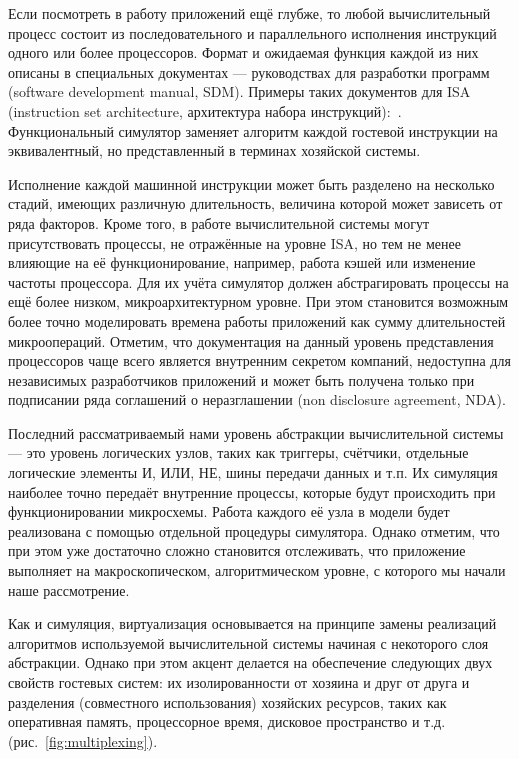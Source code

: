 Если посмотреть в работу приложений ещё глубже, то любой вычислительный процесс состоит из последовательного и параллельного исполнения инструкций одного или более процессоров. Формат и ожидаемая функция каждой из них описаны в специальных документах --- руководствах для разработки программ (\abbr software development manual, SDM). Примеры таких документов для ISA (\abbr instruction set architecture, архитектура набора инструкций):~\cite{intelmanual-7vols, amd-sdm-vol1, weaver1994sparc, arm-sdg, alpha-book}. Функциональный симулятор заменяет алгоритм каждой гостевой инструкции на эквивалентный, но представленный в терминах хозяйской системы.

Исполнение каждой машинной инструкции может быть разделено на несколько стадий, имеющих различную длительность, величина которой может зависеть от ряда факторов. Кроме того, в работе вычислительной системы могут присутствовать процессы, не отражённые на уровне ISA, но тем не менее влияющие на её функционирование, например, работа кэшей или изменение частоты процессора. Для их учёта симулятор должен абстрагировать процессы на ещё более низком, микроархитектурном уровне. При этом становится возможным более точно моделировать времена работы приложений как сумму длительностей микроопераций. Отметим, что документация на данный уровень представления процессоров чаще всего является внутренним секретом компаний, недоступна для независимых разработчиков приложений и может быть получена только при подписании ряда соглашений о неразглашении (\abbr non disclosure agreement, NDA).

Последний рассматриваемый нами уровень абстракции вычислительной системы --- это уровень логических узлов, таких как триггеры, счётчики, отдельные логические элементы И, ИЛИ, НЕ, шины передачи данных и т.п. Их симуляция наиболее точно передаёт внутренние процессы, которые будут происходить при функционировании микросхемы. Работа каждого её узла в модели будет реализована с помощью отдельной процедуры симулятора. Однако отметим, что при этом уже достаточно сложно становится отслеживать, что приложение выполняет на макроскопическом, алгоритмическом уровне, с которого мы начали наше рассмотрение.

Как и симуляция, виртуализация основывается на принципе замены реализаций алгоритмов используемой вычислительной системы начиная с некоторого слоя абстракции. Однако при этом акцент делается на обеспечение следующих двух свойств гостевых систем: их изолированности от хозяина и друг от друга и разделения (совместного использования) хозяйских ресурсов, таких как оперативная память, процессорное время, дисковое пространство и т.д. (рис.~\ref{fig:multiplexing}).

